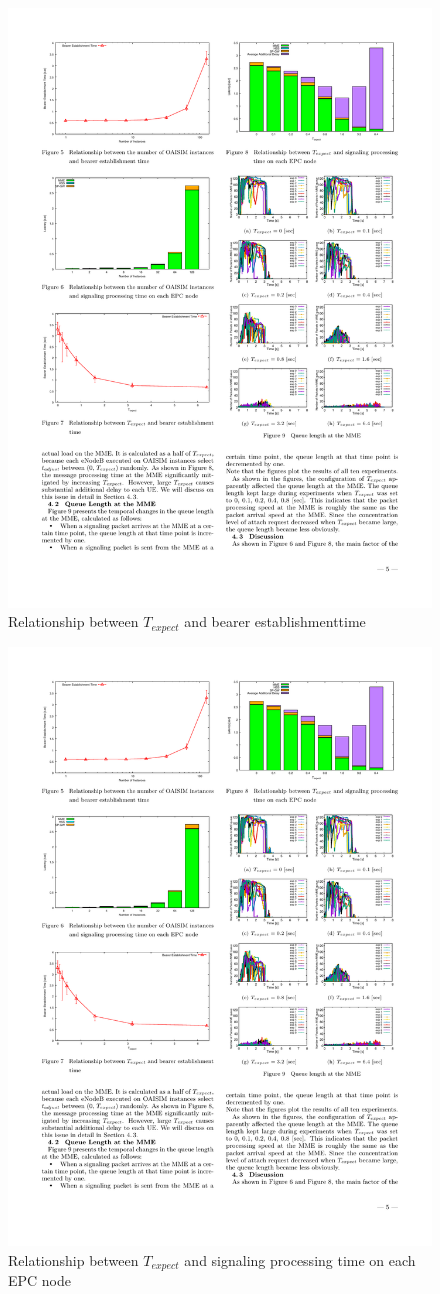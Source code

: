 \documentclass[a4j]{ujarticle}
\begin{document}
\begin{figure}[htbp]
  \centering
  \includegraphics[width=0.6\hsize]{t_expect_ueno.pdf}
  \caption{Relationship between $T_{expect}$ and bearer establishmenttime}
  \label{t_expect_ueno}
\end{figure}

\begin{figure}[htbp]
  \centering
  \includegraphics[width=0.6\hsize]{Latency_node_ueno.pdf}
  \caption{Relationship between $T_{expect}$ and signaling processing time on each EPC node}
  \label{Latency_node_ueno}
\end{figure}
\end{document}
